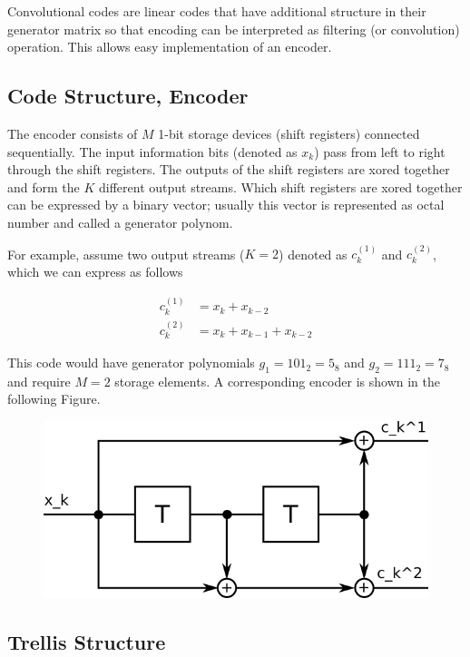 
Convolutional codes are linear codes that have additional structure in their generator matrix so that encoding can be interpreted as filtering (or convolution) operation. This allows easy implementation of an encoder.

\subsection{Code Structure, Encoder}

The encoder consists of $M$ 1-bit storage devices (shift registers) connected sequentially. The input information bits (denoted as $x_k$) pass from left to right through the shift registers. The outputs of the shift registers are xored together and form the $K$ different output streams. Which shift registers are xored together can be expressed by a binary vector; usually this vector is represented as octal number and called a generator polynom.

For example, assume two output streams ($K = 2$) denoted as $c_{k}^{(1)}$ and $c_{k}^{(2)}$, which we can express as follows

\begin{align*}
c_{k}^{(1)} &= x_k + x_{k-2} \\
c_{k}^{(2)} &= x_k + x_{k-1} + x_{k-2}
\end{align*}

This code would have generator polynomials $g_1 = 101_2 = 5_8$ and $g_2 = 111_2 = 7_8$ and require $M=2$ storage elements. A corresponding encoder is shown in the following Figure.

\begin{figure}[h]
  \includegraphics[scale=1.5]{images/convcodes_1_1.png}
\end{figure}


\subsection{Trellis Structure}

